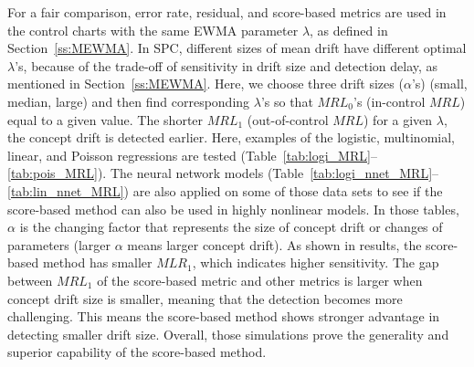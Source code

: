 \documentclass[twoside,11pt]{article}
\begin{document}
\begin{appendix}
For a fair comparison, error rate, residual, and score-based metrics are used in the control charts with the same EWMA parameter $\lambda$, as defined in Section~\ref{ss:MEWMA}. In SPC, different sizes of mean drift have different optimal $ \lambda$'s, because of the trade-off of sensitivity in drift size and detection delay, as mentioned in Section~\ref{ss:MEWMA}. Here, we choose three drift sizes ($\alpha$'s) (small, median, large) and then find corresponding $ \lambda$'s so that $MRL_0$'s (in-control $MRL$) equal to a given value. The shorter $MRL_1$ (out-of-control $MRL$) for a given $ \lambda$, the concept drift is detected earlier. Here, examples of the logistic, multinomial, linear, and Poisson regressions are tested (Table~\ref{tab:logi_MRL}--\ref{tab:pois_MRL}). The neural network models (Table~\ref{tab:logi_nnet_MRL}--\ref{tab:lin_nnet_MRL}) are also applied on some of those data sets to see if the score-based method can also be used in highly nonlinear models. In those tables, $ \alpha$ is the changing factor that represents the size of concept drift or changes of parameters (larger $ \alpha$ means larger concept drift). As shown in results, the score-based method has smaller $MLR_1$, which indicates higher sensitivity. The gap between $MRL_1$ of the score-based metric and other metrics is larger when concept drift size is smaller, meaning that the detection becomes more challenging. This means the score-based method shows stronger advantage in detecting smaller drift size. Overall, those simulations prove the generality and superior capability of the score-based method.


\end{appendix}
\end{document}

